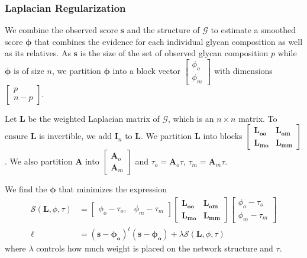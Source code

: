    \subsubsection{Laplacian Regularization}
        We combine the observed score $\mathbf{s}$ and the structure
        of $\mathcal{G}$ to estimate a smoothed score $\mathbf{\phi}$
        that combines the evidence for each individual glycan composition
        as well as its relatives. As $\mathbf{s}$ is the size of the
        set of observed glycan composition $p$ while $\mathbf{\phi}$
        is of size $n$, we partition $\mathbf{\phi}$ into a block
        vector $\begin{bmatrix}\phi_o\\ \phi_m\end{bmatrix}$ with
        dimensions $\begin{bmatrix}p\\ n-p\end{bmatrix}$.

        Let $\mathbf{L}$ be the weighted Laplacian matrix of $\mathcal{G}$,
        which is an $n \times n$ matrix. To ensure $\mathbf{L}$ is
        invertible, we add $\mathbf{I}_n$ to $\mathbf{L}$. We partition
        $\mathbf{L}$ into blocks $\begin{bmatrix} \mathbf{L_{oo}} &
        \mathbf{L_{om}} \\ \mathbf{L_{mo}} & \mathbf{L_{mm}}\end{bmatrix}$.
        We also partition $\mathbf{A}$ into $\begin{bmatrix}\mathbf{A}_o\\
        \mathbf{A}_m\end{bmatrix}$ and $\tau_o = \mathbf{A}_o\tau$,
        $\tau_m = \mathbf{A}_m\tau$.

        We find the $\mathbf{\phi}$ that minimizes the expression
        \begin{align}
            \mathcal{S}(\mathbf{L}, \phi, \tau) &= \begin{bmatrix}
                    \phi_o - \tau_o, & \phi_m - \tau_m
                \end{bmatrix}
                \begin{bmatrix}
                    \mathbf{L_{oo}} & \mathbf{L_{om}} \\ \mathbf{L_{mo}} & \mathbf{L_{mm}}
                \end{bmatrix}
                \begin{bmatrix}
                    \phi_o - \tau_o \\ \phi_m - \tau_m
                \end{bmatrix} \\
            \ell &= (\mathbf{s} - \mathbf{\phi_o})^t(\mathbf{s} - \mathbf{\phi_o}) + \lambda
                \mathcal{S}(\mathbf{L}, \phi, \tau) \label{eqn:laplacian_regularization_objective_function}
        \end{align}
        \noindent where $\lambda$ controls how much weight is
        placed on the network structure and $\tau$.

